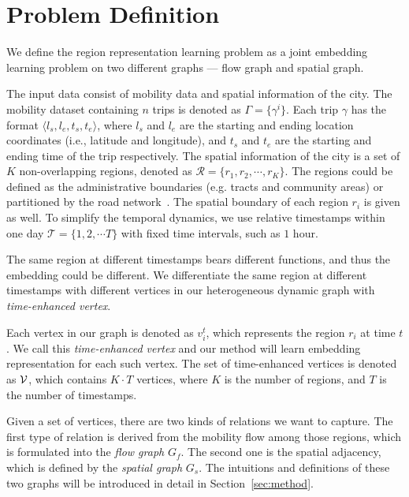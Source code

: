 \section{Problem Definition}
\label{ch3-sec:definition}


We define the region representation learning problem as a joint embedding learning problem on two different graphs --- flow graph and spatial graph.


The input data consist of mobility  data and spatial information of the city. The mobility dataset containing $n$ trips is denoted as $\Gamma = \{ \gamma^i \}$. Each trip $\gamma$ has the format $\langle l_s, l_e, t_s, t_e \rangle$, where $l_s$ and $l_e$ are the starting and ending location coordinates (i.e., latitude and longitude), and $t_s$ and $t_e$ are the starting and ending time of the trip respectively. The spatial information of the city is a set of $K$ non-overlapping regions, denoted as $\mathcal{R} = \{ r_1, r_2, \cdots, r_K \}$. The regions could be defined as the administrative boundaries (e.g. tracts and community areas) or partitioned by the road network~\cite{yuan2012discovering}. The spatial boundary of each region $r_i$ is given as well. To simplify the temporal dynamics, we use relative timestamps within one day $\mathcal{T} = \{ 1, 2, \cdots T\}$ with fixed time intervals, such as $1$ hour.


The same region at different timestamps bears different functions, and thus the embedding could be different. We differentiate the same region at different timestamps with different vertices in our heterogeneous dynamic graph with \emph{time-enhanced vertex}. 


\begin{definition}
Each vertex in our graph is denoted as $v_i^t$, which represents the region $r_i$ at time $t$. We call this \emph{time-enhanced vertex} and our method will learn embedding representation for each such vertex. The set of time-enhanced vertices is denoted as $\mathcal{V}$, which contains $K \cdot T$ vertices, where $K$ is the number of regions, and $T$ is the number of timestamps.
\end{definition}


Given a set of vertices, there are two kinds of relations we want to capture. The first type of relation is derived from the mobility flow among those regions, which is formulated into the \emph{flow graph} $G_f$. The second one is the spatial adjacency, which is defined by the \emph{spatial graph} $G_s$. The intuitions and definitions of these two graphs will be introduced in detail in Section~\ref{sec:method}.


